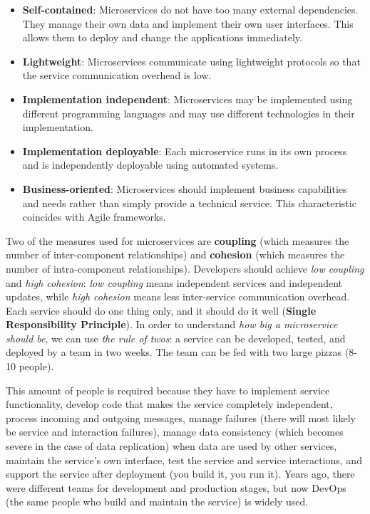 \begin{itemize}
    \item \textbf{Self-contained}: Microservices do not have too many external dependencies. They manage their own data and implement their own user interfaces. This allows them to deploy and change the applications immediately.
    \item \textbf{Lightweight}: Microservices communicate using lightweight protocols so that the service communication overhead is low.
    \item \textbf{Implementation independent}: Microservices may be implemented using different programming languages and may use different technologies in their implementation.
    \item \textbf{Implementation deployable}: Each microservice runs in its own process and is independently deployable using automated systems.
    \item \textbf{Business-oriented}: Microservices should implement business capabilities and needs rather than simply provide a technical service. This characteristic coincides with Agile frameworks.
\end{itemize}

Two of the measures used for microservices are \textbf{coupling} (which measures the number of inter-component relationships) and \textbf{cohesion} (which measures the number of intra-component relationships). Developers should achieve \textit{low coupling} and \textit{high cohesion}: \textit{low coupling} means independent services and independent updates, while \textit{high cohesion} means less inter-service communication overhead. \\

Each service should do one thing only, and it should do it well (\textbf{Single Responsibility Principle}). In order to understand \textit{how big a microservice should be}, we can use \textit{the rule of twos}: a service can be developed, tested, and deployed by a team in two weeks. The team can be fed with two large pizzas (8-10 people). 

This amount of people is required because they have to implement service functionality, develop code that makes the service completely independent, process incoming and outgoing messages, manage failures (there will most likely be service and interaction failures), manage data consistency (which becomes severe in the case of data replication) when data are used by other services, maintain the service's own interface, test the service and service interactions, and support the service after deployment (you build it, you run it). Years ago, there were different teams for development and production stages, but now DevOps (the same people who build and maintain the service) is widely used.

